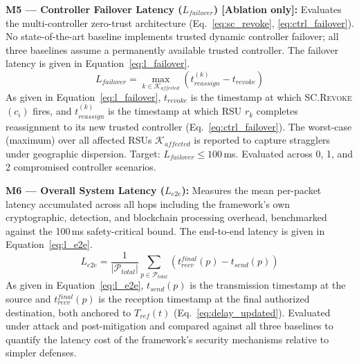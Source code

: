 \documentclass[12pt, a4paper]{report}
\begin{document}
{{%

\textbf{M5 — Controller Failover Latency
($L_{failover}$) [Ablation only]:}
Evaluates the multi-controller zero-trust architecture
(Eq.~\ref{eq:sc_revoke}, \ref{eq:ctrl_failover}).
No state-of-the-art baseline implements trusted
dynamic controller failover; all three baselines assume
a permanently available trusted controller.
The failover latency is given in
Equation~\eqref{eq:l_failover}.
\begin{equation}
L_{failover} =
\underset{k \in \mathcal{K}_{affected}}{\max}
\left(
t_{reassign}^{(k)} - t_{revoke}
\right)
\label{eq:l_failover}
\end{equation}
As given in Equation~\eqref{eq:l_failover},
$t_{revoke}$ is the timestamp at which
\textsc{SC.Revoke}$(c_i)$ fires, and
$t_{reassign}^{(k)}$ is the timestamp at which
\ac{RSU} $r_k$ completes reassignment to its new
trusted controller (Eq.~\ref{eq:ctrl_failover}).
The worst-case (maximum) over all affected RSUs
$\mathcal{K}_{affected}$ is reported to capture
stragglers under geographic dispersion. Target:
$L_{failover} \leq 100$\,ms. Evaluated across
0, 1, and 2 compromised controller scenarios.



\textbf{M6 — Overall System Latency ($L_{e2e}$):}
Measures the mean per-packet latency accumulated
across all hops including the framework's own
cryptographic, detection, and blockchain processing
overhead, benchmarked against the 100\,ms
safety-critical bound. The end-to-end latency is
given in Equation~\eqref{eq:l_e2e}.
\begin{equation}
L_{e2e} =
\frac{1}{|\mathcal{P}_{total}|}
\sum_{p \in \mathcal{P}_{total}}
\left(
t_{recv}^{final}(p) - t_{send}(p)
\right)
\label{eq:l_e2e}
\end{equation}
As given in Equation~\eqref{eq:l_e2e},
$t_{send}(p)$ is the transmission timestamp at the
source and $t_{recv}^{final}(p)$ is the reception
timestamp at the final authorized destination,
both anchored to $T_{ref}(t)$
(Eq.~\ref{eq:delay_updated}). Evaluated under
attack and post-mitigation and compared against
all three baselines to quantify the latency cost
of the framework's security mechanisms relative
to simpler defenses.


}}
\end{document}
